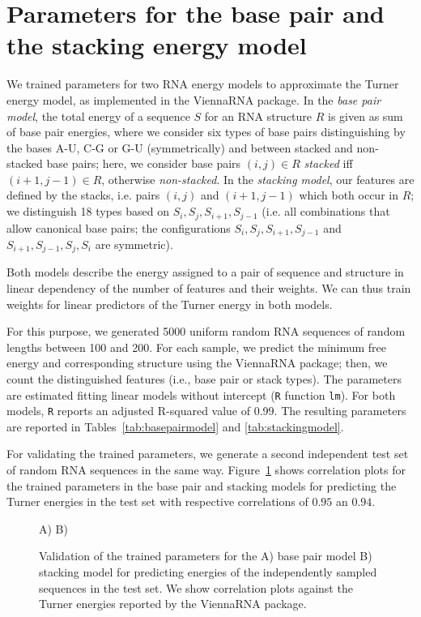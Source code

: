 \documentclass{bioinfo}
\makeatletter
\newlength{\@aligneps}
\newcommand{\includegraphicstop}[2][]{%
\sbox{\@alignepsbox}{\texttt{[image: \#2]}}%
\setlength{\@aligneps}{-\ht\@alignepsbox}%
\addtolength{\@aligneps}{2ex}%
\raisebox{\@aligneps}{\usebox{\@alignepsbox}}}
\newcommand{\Def}[1]{{\it #1}}
\newcommand{\Software}[1]{{\ttfamily #1}}
\makeatother
\begin{document}
\section{Parameters for the base pair and the stacking energy model}
\label{appsec:modelparameters}

We trained parameters for two RNA energy models to approximate the
Turner energy model, as implemented in the \Software{ViennaRNA}
package.  In the \Def{base pair model}, the total energy of a sequence $S$
for an RNA structure $R$ is given as sum of base pair energies, where
we consider six types of base pairs distinguishing by the bases A-U,
C-G or G-U (symmetrically) and between stacked and non-stacked base
pairs; here, we consider base pairs $(i,j)\in R$ \emph{stacked} iff
$(i+1,j-1)\in R$, otherwise \emph{non-stacked}. In the \Def{stacking model},
our features are defined by the stacks, i.e. pairs $(i,j)$ and
$(i+1,j-1)$ which both occur in $R$; we distinguish 18 types based on
$S_i,S_j,S_{i+1},S_{j-1}$ (i.e. all combinations that allow canonical
base pairs; the configurations $S_i,S_j,S_{i+1},S_{j-1}$ and
$S_{i+1},S_{j-1},S_j,S_i$ are symmetric).

Both models describe the energy assigned to a pair of sequence and
structure in linear dependency of the number of features and their
weights. We can thus train weights for linear predictors of the Turner
energy in both models.

For this purpose, we generated 5000 uniform random RNA sequences of
random lengths between 100 and 200. For each sample, we predict the
minimum free energy and corresponding structure using the ViennaRNA
package; then, we count the distinguished features (i.e., base pair or
stack types). The parameters are estimated fitting linear models
without intercept (\texttt{R} function \texttt{lm}). For both models,
\texttt{R} reports an adjusted R-squared value of 0.99. The resulting
parameters are reported in Tables~\ref{tab:basepairmodel} and
\ref{tab:stackingmodel}.

For validating the trained parameters, we generate a second
independent test set of random RNA sequences in the same
way. Figure~\ref{fig:training-cor} shows correlation plots for the
trained parameters in the base pair and stacking models for predicting
the Turner energies in the test set with respective correlations of
$0.95$ an $0.94$.

\begin{figure}
  \centering
  A)%
  B)%
  \caption{Validation of the trained parameters for the A) base pair
    model B) stacking model for predicting energies of the
    independently sampled sequences in the test set. We show
    correlation plots against the Turner energies reported by the
    ViennaRNA package.}
  \label{fig:training-cor}
\end{figure}
\end{document}
